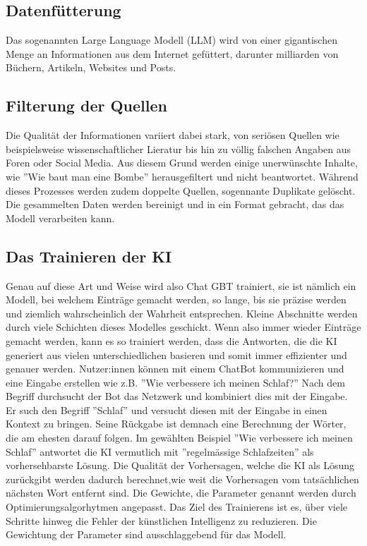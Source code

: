 \documentclass{report}
\begin{document}
\subsection{Datenfütterung}
Das sogenannten Large Language Modell (LLM) wird von einer gigantischen Menge an Informationen aus dem Internet gefüttert, darunter milliarden von Büchern, Artikeln, Websites und Posts.
\subsection{Filterung der Quellen} 
Die Qualität der Informationen variiert dabei stark, von seriösen Quellen wie beispielsweise wissenschaftlicher Lieratur bis hin zu völlig falschen Angaben aus Foren oder Social Media. Aus diesem Grund werden einige unerwünschte Inhalte, wie ''Wie baut man eine Bombe'' herausgefiltert und nicht beantwortet. Während dieses Prozesses werden zudem doppelte Quellen, sogennante Duplikate gelöscht. Die gesammelten Daten werden bereinigt und in ein Format gebracht, das das Modell verarbeiten kann.
\subsection{Das Trainieren der KI} 
Genau auf diese Art und Weise wird also Chat GBT trainiert, sie ist nämlich ein Modell, bei welchem Einträge gemacht werden, so lange, bis sie präzise werden und ziemlich wahrscheinlich der Wahrheit entsprechen. Kleine Abschnitte werden durch viele Schichten dieses Modelles geschickt. Wenn also immer wieder Einträge gemacht werden, kann es so trainiert werden, dass die Antworten, die die KI generiert aus vielen unterschiedlichen basieren und somit immer effizienter und genauer werden. Nutzer:innen können mit einem ChatBot kommunizieren und eine Eingabe erstellen wie z.B. ''Wie verbessere ich meinen Schlaf?'' Nach dem Begriff durchsucht der Bot das Netzwerk und kombiniert dies mit der Eingabe. Er such den Begriff ''Schlaf'' und versucht diesen mit der Eingabe in einen Kontext zu bringen. Seine Rückgabe ist demnach eine Berechnung der Wörter, die am ehesten darauf folgen. Im gewählten Beispiel ''Wie verbessere ich meinen Schlaf'' antwortet die KI vermutlich mit ''regelmässige Schlafzeiten'' als vorhersehbarste Lösung. Die Qualität der Vorhersagen, welche die KI als Lösung zurückgibt werden dadurch berechnet,wie weit die Vorhersagen vom tatsächlichen nächsten Wort entfernt sind.
Die Gewichte, die Parameter genannt werden durch Optimierungsalgorhytmen angepasst. Das Ziel des Trainierens ist es, über viele Schritte hinweg die Fehler der künstlichen Intelligenz zu reduzieren. Die Gewichtung der Parameter sind ausschlaggebend für das Modell.
\end{document}
